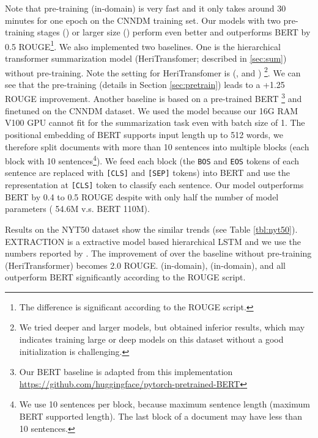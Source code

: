 \documentclass[11pt,a4paper]{article}
\begin{document}
Note that pre-training  (in-domain) is very fast and it only takes around 30 minutes for one epoch on the CNNDM training set. Our models with two pre-training stages () or larger size () perform even better and  outperforms BERT by 0.5 ROUGE\footnote{The difference is significant according to the ROUGE script.}. We also implemented two baselines. One is the hierarchical transformer summarization model (HeriTransfomer; described in \ref{sec:sum}) without pre-training. Note the setting for HeriTransfomer is (, and ) \footnote{We tried deeper and larger models, but obtained inferior results, which may indicates training large or deep models on this dataset without a good initialization is challenging.}. We can see that the pre-training (details in Section \ref{sec:pretrain}) leads to a +1.25 ROUGE improvement. Another baseline is based on a pre-trained BERT \cite{devlin:2018:arxiv}\footnote{Our BERT baseline is adapted from this implementation \url{https://github.com/huggingface/pytorch-pretrained-BERT}} and finetuned on the CNNDM dataset. We used the  model because our 16G RAM V100 GPU cannot fit  for the summarization task even with batch size of 1. The positional embedding of BERT supports input length up to 512 words, we therefore split documents with more than 10 sentences into multiple blocks (each block with 10 sentences\footnote{We use 10 sentences per block, because maximum sentence length  (maximum BERT supported length). The last block of a document may have less than 10 sentences.}). We feed each block (the {\tt BOS} and {\tt EOS} tokens of each sentence are replaced with {\tt [CLS]} and {\tt [SEP]} tokens) into BERT and use the representation at {\tt [CLS]} token to classify each sentence. Our model  outperforms BERT by 0.4 to 0.5 ROUGE despite with only half the number of model parameters ( 54.6M v.s. BERT 110M). 

Results on the NYT50 dataset show the similar trends (see Table \ref{tbl:nyt50}). EXTRACTION is a extractive model based hierarchical LSTM and we use the numbers reported by . The improvement of  over the baseline without pre-training (HeriTransformer) becomes 2.0 ROUGE.  (in-domain),  (in-domain),  and  all outperform BERT significantly according to the ROUGE script.
\end{document}
